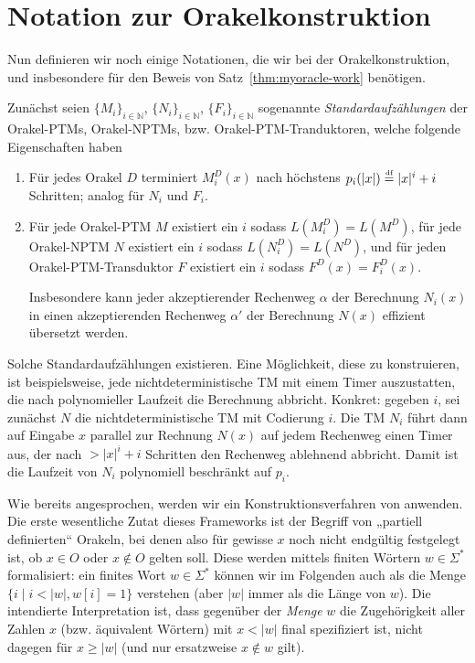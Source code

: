\section{Notation zur Orakelkonstruktion}\label{sec:oracle-notation}

Nun definieren wir noch einige Notationen, die wir bei der Orakelkonstruktion, und insbesondere für den Beweis von Satz~\ref{thm:myoracle-work} benötigen.

Zunächst seien $\{M_i\}_{i\in \mathbb N}$, $\{N_i\}_{i\in \mathbb N}$, $\{F_i\}_{i\in\mathbb N}$ sogenannte \emph{Standardaufzählungen} der Orakel-PTMs, Orakel-NPTMs, bzw. Orakel-PTM-Tranduktoren, welche folgende Eigenschaften haben
\begin{enumerate}[label=\arabic*.]
    \item Für jedes Orakel $D$ terminiert $M_i^D(x)$ nach höchstens $p_i(|x|)\stackrel{\text{{\normalfont\tiny df}}}{=} |x|^i+i$ Schritten; analog für $N_i$ und $F_i$.
    \item Für jede Orakel-PTM $M$ existiert ein $i$ sodass $L(M^D_i)=L(M^D)$, 
        für jede Orakel-NPTM $N$ existiert ein $i$ sodass $L(N^D_i)=L(N^D)$, und
        für jeden Orakel-PTM-Transduktor $F$ existiert ein $i$ sodass $F^D(x)=F_i^D(x)$.

        Insbesondere kann jeder akzeptierender Rechenweg $\alpha$ der Berechnung $N_i(x)$ in einen akzeptierenden Rechenweg $\alpha'$ der Berechnung $N(x)$ effizient übersetzt werden.
\end{enumerate}
Solche Standardaufzählungen existieren. Eine Möglichkeit, diese zu konstruieren, ist beispielsweise, jede nichtdeterministische TM mit einem Timer auszustatten, die nach polynomieller Laufzeit die Berechnung abbricht. Konkret: gegeben $i$, sei zunächst $N$ die nichtdeterministische TM mit Codierung $i$. Die TM $N_i$ führt dann auf Eingabe $x$ parallel zur Rechnung $N(x)$ auf jedem Rechenweg einen Timer aus, der nach $>|x|^i+i$ Schritten den Rechenweg ablehnend abbricht.
Damit ist die Laufzeit von $N_i$ polynomiell beschränkt auf $p_i$.

Wie bereits angesprochen, werden wir ein Konstruktionsverfahren von \citeauthor{dose_np-completeness_2019} anwenden. Die erste wesentliche Zutat dieses Frameworks ist der Begriff von „partiell definierten“ Orakeln, bei denen also für gewisse $x$ noch nicht endgültig festgelegt ist, ob $x\in O$ oder $x\not\in O$ gelten soll.
Diese werden mittels finiten Wörtern $w\in\Sigma^*$ formalisiert:
ein finites Wort $w\in\Sigma^*$ können wir im Folgenden auch als die Menge $\{ i \mid i<|w|, w[i] = 1 \}$ verstehen (aber $|w|$ immer als die Länge von $w$).
Die intendierte Interpretation ist, dass gegenüber der \emph{Menge} $w$ die Zugehörigkeit aller Zahlen $x$ (bzw. äquivalent Wörtern) mit $x<|w|$ final spezifiziert ist, nicht dagegen für $x\geq|w|$ (und nur ersatzweise $x\not\in w$ gilt).


